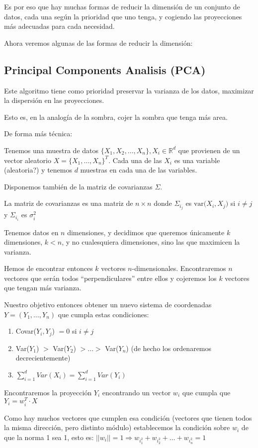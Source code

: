 \documentclass[a4paper,10pt]{article}
\begin{document}
Es por eso que hay muchas formas de reducir la dimensión de un conjunto de datos, cada una según la prioridad que uno tenga, y cogiendo las proyecciones más adecuadas para cada necesidad.

Ahora veremos algunas de las formas de reducir la dimensión:
\subsection{Principal Components Analisis (PCA)}
Este algoritmo tiene como prioridad preservar la varianza de los datos, maximizar la dispersión en las proyecciones.

Esto es, en la analogía de la sombra, cojer la sombra que tenga más area.

De forma más técnica:

Tenemos una muestra de datos $\{X_1,X_2,\dots, X_n\}, X_i \in \mathbb{R}^d$ que provienen de un vector aleatorio $X = \{X_1,\dots,X_n\}^T$. Cada una de las $X_i$ es una variable (aleatoria?) y tenemos $d$ muestras en cada una de las variables.

Disponemos también de la matriz de covarianzas $\Sigma$.

La matriz de covarianzas es una matriz de $n \times n$ donde $\Sigma_i_j$ es $\text{var(}X_i,X_j\text{)}$ si $i \neq j$ y $\Sigma_i_i$ es $\sigma_i^2$

Tenemos datos en $n$ dimensiones, y decidimos que queremos únicamente $k$ dimensiones, $k < n$, y no cualesquiera dimensiones, sino las que maximicen la varianza.

Hemos de encontrar entonces $k$ vectores $n$-dimensionales. Encontraremos $n$ vectores que serán todos ``perpendiculares'' entre ellos y cojeremos los $k$ vectores que tengan más varianza.

Nuestro objetivo entonces obtener un nuevo sistema de coordenadas $Y = (Y_1,\dots,Y_n)$ que cumpla estas condiciones:
\begin{enumerate}
  \item Covar($Y_i,Y_j$) $ = 0$ si $i \neq j$
  \item Var($Y_1$) $>$ Var($Y_2$) $> \dots > $ Var($Y_n$) (de hecho los ordenaremos decrecientemente)
  \item $\sum_{i = 1}^{d} Var(X_i) = \sum_{i = 1}^{d} Var(Y_i)$
\end{enumerate}

Encontraremos la proyección $Y_i$ encontrando un vector $w_i$ que cumpla que $Y_i = w_i^T \cdot X$

Como hay muchos vectores que cumplen esa condición (vectores que tienen todos la misma dirección, pero distinto módulo) establecemos la condición sobre $w_i$ de que la norma 1 sea 1, esto es: $||w_i|| = 1 \Rightarrow w_i_1^2 + w_i_2^2 + \dots + w_i_n^2 = 1$
\end{document}
